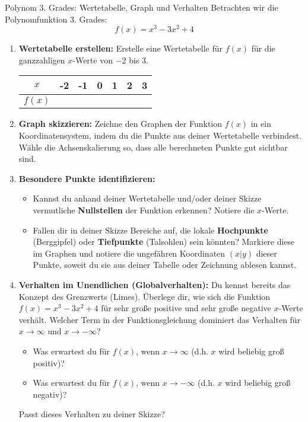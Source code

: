 \begin{aufgabenumgebung}{Polynom 3. Grades: Wertetabelle, Graph und Verhalten}
Betrachten wir die Polynomfunktion 3. Grades:
\[ f(x) = x^3 - 3x^2 + 4 \]
\begin{enumerate}[label=(\alph*)]
    \item \textbf{Wertetabelle erstellen:} Erstelle eine Wertetabelle für $f(x)$ für die ganzzahligen $x$-Werte von $-2$ bis $3$.
    \begin{center}
    \begin{tabular}{c||c|c|c|c|c|c}
    $x$ & -2 & -1 & 0 & 1 & 2 & 3 \\
    \hline
    $f(x)$ &    &    &   &   &   &   \\
    \end{tabular}
    \end{center}
    \item \textbf{Graph skizzieren:} Zeichne den Graphen der Funktion $f(x)$ in ein Koordinatensystem, indem du die Punkte aus deiner Wertetabelle verbindest. Wähle die Achsenskalierung so, dass alle berechneten Punkte gut sichtbar sind.
    \item \textbf{Besondere Punkte identifizieren:}
    \begin{itemize}
        \item Kannst du anhand deiner Wertetabelle und/oder deiner Skizze vermutliche \textbf{Nullstellen} der Funktion erkennen? Notiere die $x$-Werte.
        \item Fallen dir in deiner Skizze Bereiche auf, die lokale \textbf{Hochpunkte} (Berggipfel) oder \textbf{Tiefpunkte} (Talsohlen) sein könnten? Markiere diese im Graphen und notiere die ungefähren Koordinaten $(x|y)$ dieser Punkte, soweit du sie aus deiner Tabelle oder Zeichnung ablesen kannst.
    \end{itemize}
    \item \textbf{Verhalten im Unendlichen (Globalverhalten):}
    Du kennst bereits das Konzept des Grenzwerts (Limes). Überlege dir, wie sich die Funktion $f(x) = x^3 - 3x^2 + 4$ für sehr große positive und sehr große negative $x$-Werte verhält. Welcher Term in der Funktionsgleichung dominiert das Verhalten für $x \to \infty$ und $x \to -\infty$?
    \begin{itemize}
        \item Was erwartest du für $f(x)$, wenn $x \to \infty$ (d.h. $x$ wird beliebig groß positiv)?
        \item Was erwartest du für $f(x)$, wenn $x \to -\infty$ (d.h. $x$ wird beliebig groß negativ)?
    \end{itemize}
    Passt dieses Verhalten zu deiner Skizze?
\end{enumerate}
\end{aufgabenumgebung}



